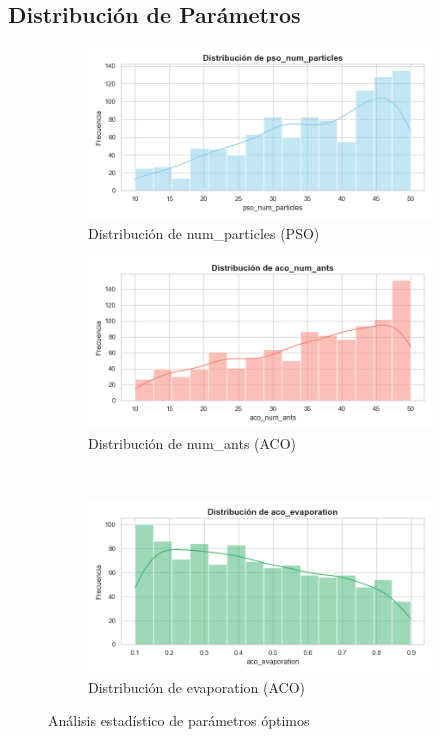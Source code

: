 \documentclass{article}
\begin{document}
\subsection{Distribución de Parámetros}
\begin{figure}[h]
\centering
\begin{subfigure}{0.45\textwidth}
    \includegraphics[width=\textwidth]{pso_num_particles_dist.png}
    \caption{Distribución de num\_particles (PSO)}
\end{subfigure}
\hfill
\begin{subfigure}{0.45\textwidth}
    \includegraphics[width=\textwidth]{aco_num_ants_dist.png}
    \caption{Distribución de num\_ants (ACO)}
\end{subfigure}
\\
\begin{subfigure}{0.6\textwidth}
    \includegraphics[width=\textwidth]{aco_evaporation_dist.png}
    \caption{Distribución de evaporation (ACO)}
\end{subfigure}
\caption{Análisis estadístico de parámetros óptimos}
\end{figure}
\end{document}
